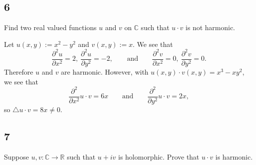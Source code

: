 \documentclass[12pt]{article}
\begin{document}
\subsection*{6}
\begin{tcolorbox}
Find two real valued functions $u$ and $v$ on $\mathbb{C}$ such that $u\cdot v$ is not harmonic.
\end{tcolorbox}

Let $u(x,y) := x^{2} - y^{2}$ and $v(x,y) := x$. We see that 
\[ \frac{\partial^{2}u}{\partial x^{2}} = 2, \ \frac{\partial^{2}u}{\partial y^{2}} = -2, \qquad \text{and}\qquad 
\frac{\partial^{2}v}{\partial x^{2}} = 0, \ \frac{\partial^{2}v}{\partial y^{2}} = 0. \]
Therefore $u$ and $v$ are harmonic. However, with $u(x,y)\cdot v(x,y) = x^{3} - xy^{2}$, we see that
\[ \frac{\partial^{2}}{\partial x^{2}}u\cdot v = 6x \qquad \text{and}\qquad \frac{\partial^{2}}{\partial y^{2}}u\cdot v = 2x, \]
so $\triangle u\cdot v = 8x \neq 0$.



\subsection*{7}
\begin{tcolorbox}
Suppose $u,v : \mathbb{C} \rightarrow \mathbb{R}$ such that $u + iv$ is holomorphic. Prove that $u\cdot v$ is harmonic.
\end{tcolorbox}
\end{document}
